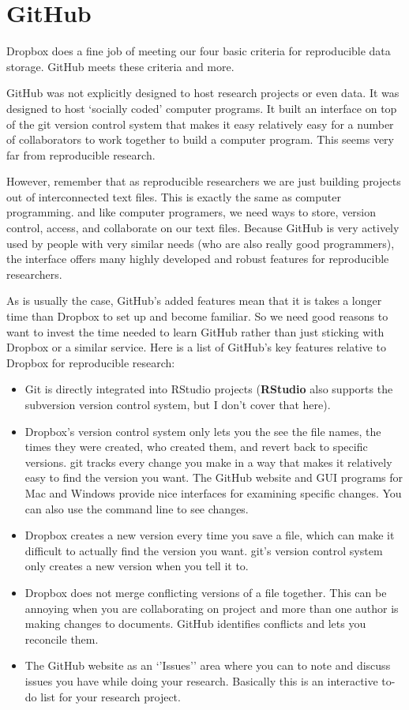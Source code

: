 \documentclass[ChapterTOCs,krantz1]{krantz}\usepackage{graphicx, color}
\begin{document}
{{\section{GitHub}

Dropbox does a fine job of meeting our four basic criteria for
reproducible data storage. GitHub meets these criteria and
more.

GitHub was not explicitly designed to host research projects or
even data. It was designed to host `socially coded' computer programs.
It built an interface on top of the git version control system
that makes it easy relatively easy for a number of collaborators to work
together to build a computer program. This seems very far from
reproducible research.

However, remember that as reproducible researchers we are just building
projects out of interconnected text files. This is exactly the same as
computer programming. and like computer programers, we need ways to
store, version control, access, and collaborate on our text files.
Because GitHub is very actively used by people with very
similar needs (who are also really good programmers), the interface
offers many highly developed and robust features for reproducible
researchers.

As is usually the case, GitHub's added features mean that it is
takes a longer time than Dropbox to set up and become familiar.
So we need good reasons to want to invest the time needed to learn
GitHub rather than just sticking with Dropbox or a
similar service. Here is a list of GitHub's key features
relative to Dropbox for reproducible research:

\begin{itemize}
\item
  Git is directly integrated into RStudio projects
  (\textbf{RStudio} also supports the subversion version
  control system, but I don't cover that here).
\item
  Dropbox's version control system only lets you the see the
  file names, the times they were created, who created them, and revert
  back to specific versions. git tracks every change you make
  in a way that makes it relatively easy to find the version you want.
  The GitHub website and GUI programs for Mac and Windows
  provide nice interfaces for examining specific changes. You can also
  use the command line to see changes.
\item
  Dropbox creates a new version every time you save a file,
  which can make it difficult to actually find the version you want.
  git's version control system only creates a new version when
  you tell it to.
\item
  Dropbox does not merge conflicting versions of a file
  together. This can be annoying when you are collaborating on project
  and more than one author is making changes to documents.
  GitHub identifies conflicts and lets you reconcile them.
\item
  The GitHub website as an `'Issues'' area where you can to
  note and discuss issues you have while doing your research. Basically
  this is an interactive to-do list for your research project.
\end{itemize}

}}
\end{document}

